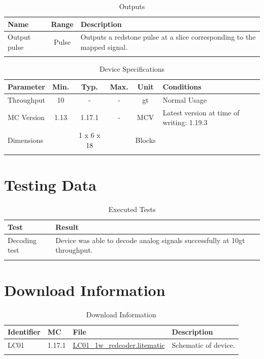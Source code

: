 \documentclass[10pt]{datasheet}
\begin{document}
\begin{table}[h]
    \caption{Outputs}
    \begin{tabularx}{\textwidth}{l | c | X}
        \thickhline
        \textbf{Name} & \textbf{Range} & \textbf{Description} \\
        \hline
        Output pulse & Pulse & Outputs a redstone pulse at a slice corresponding to the mapped signal. \\
        \thickhline
\end{tabularx}
\end{table}

\begin{table}[h]
    \caption{Device Specifications}
    \begin{tabularx}{\textwidth}{l | c c c | c | X}
        \thickhline
        \textbf{Parameter} & \textbf{Min.} & \textbf{Typ.} & \textbf{Max.} &
        \textbf{Unit} & \textbf{Conditions} \\
        \hline
        Throughput  & 10 & - & - & gt & Normal Usage \\
        \hline
        MC Version & 1.13 & 1.17.1 & - & MCV & Latest version at time of writing: 1.19.3\\
        \hline
        Dimensions & & 1 x 6 x 18 & & Blocks & \\
        \thickhline
\end{tabularx}
\end{table}
\newpage
\section{Testing Data}
\begin{table}[h]
\caption{Executed Tests}
\begin{tabularx}{\textwidth}{l | X}
    \thickhline
    \textbf{Test} & \textbf{Result} \\
    \hline
    Decoding test & Device was able to decode analog signals successfully at 10gt throughput. \\
    \thickhline
\end{tabularx}
\end{table}

\section{Download Information}
\begin{table}[h]
    \caption{Download Information}
    \begin{tabularx}{\textwidth}{l | l | l | X}
        \thickhline
        \textbf{Identifier} & \textbf{MC} & \textbf{File} & \textbf{Description} \\
        \hline
        LC01 & 1.17.1 & \href{https://github.com/Soontech-Annals/Archive/blob/92d3541e07ddc3ab90360e923907f040eca76834/Archive/logic-and-computation/LC01\%201\%20Wide\%20Redcoder/LC01\_1w\_redcoder.litematic?raw=1}{LC01\_1w\_redcoder.litematic} & Schematic of device. \\
        \hline
        \thickhline
    \end{tabularx}
\end{table}
\end{document}
